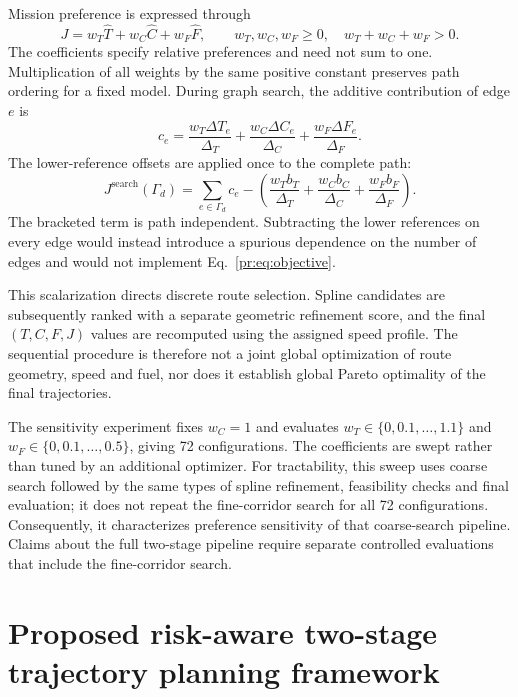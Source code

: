\documentclass[preprint,12pt]{elsarticle}
\begin{document}
Mission preference is expressed through
\begin{equation}
 J=w_T\widehat T+w_C\widehat C+w_F\widehat F,\qquad
 w_T,w_C,w_F\ge0,\quad w_T+w_C+w_F>0.
 \label{pr:eq:objective}
\end{equation}
The coefficients specify relative preferences and need not sum to one.
Multiplication of all weights by the same positive constant preserves
path ordering for a fixed model. During graph search, the additive
contribution of edge $e$ is
\begin{equation}
 c_e=\frac{w_T\Delta T_e}{\Delta_T}
     +\frac{w_C\Delta C_e}{\Delta_C}
     +\frac{w_F\Delta F_e}{\Delta_F}.
 \label{pr:eq:edgeobjective}
\end{equation}
The lower-reference offsets are applied once to the complete path:
\begin{equation}
 J^{\mathrm{search}}(\Gamma_d)=\sum_{e\in\Gamma_d}c_e
 -\left(\frac{w_Tb_T}{\Delta_T}+\frac{w_Cb_C}{\Delta_C}
                         +\frac{w_Fb_F}{\Delta_F}\right).
 \label{pr:eq:offset}
\end{equation}
The bracketed term is path independent. Subtracting the lower references
on every edge would instead introduce a spurious dependence on the number
of edges and would not implement Eq.~\eqref{pr:eq:objective}.

This scalarization directs discrete route selection. Spline candidates
are subsequently ranked with a separate geometric refinement score, and
the final $(T,C,F,J)$ values are recomputed using the assigned speed
profile. The sequential procedure is therefore not a joint global
optimization of route geometry, speed and fuel, nor does it establish
global Pareto optimality of the final trajectories.

The sensitivity experiment fixes $w_C=1$ and evaluates
$w_T\in\{0,0.1,\ldots,1.1\}$ and
$w_F\in\{0,0.1,\ldots,0.5\}$, giving 72 configurations.
The coefficients are swept rather than tuned by an additional optimizer.
For tractability, this sweep uses coarse search followed by the same
types of spline refinement, feasibility checks and final evaluation; it
does not repeat the fine-corridor search for all 72 configurations.
Consequently, it characterizes preference sensitivity of that coarse-search
pipeline. Claims about the full two-stage pipeline require separate
controlled evaluations that include the fine-corridor search.


\section{Proposed risk-aware two-stage trajectory planning framework}
\label{sec:method}
\end{document}

